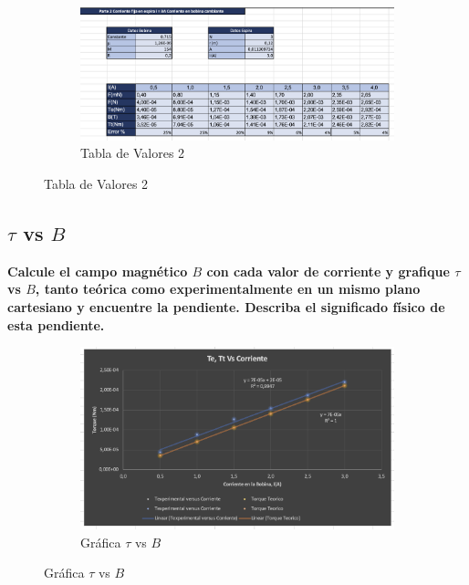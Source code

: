 \begin{figure}[H]
  \centering
  \begin{subfigure}[b]{\textwidth}
      \centering
      \includegraphics[width=\textwidth]{Figures/1. Content/tabla2.png}
      \caption{Tabla de Valores 2}
      \label{fig: Tabla 2}
  \end{subfigure}
  \hfill
\end{figure}

\subsection{$\tau$ vs $B$}
\textbf{Calcule el campo magnético $B$ con cada valor de corriente y grafique $\tau$ vs $B$, tanto
teórica como experimentalmente en un mismo plano cartesiano y encuentre la
pendiente. Describa el significado físico de esta pendiente.}

\begin{figure}[H]
  \centering
  \begin{subfigure}[b]{\textwidth}
      \centering
      \includegraphics[width=\textwidth]{Figures/1. Content/grafica2.png}
      \caption{Gráfica $\tau$ vs $B$}
      \label{fig: Grafica 2}
  \end{subfigure}
  \hfill
\end{figure}

